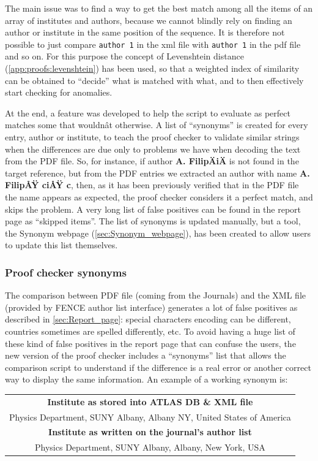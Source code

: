 The main issue was to find a way to get the best match among all the items of an array of institutes and authors,
because we cannot blindly rely on finding an author or institute in the same position of the sequence.
It is therefore not possible to just compare \texttt{author~1} in the xml file with \texttt{author~1} in the pdf file and so on.
For this purpose the concept of Levenshtein distance (\cref{app:proofs:levenshtein}) has been used,
so that a weighted index of similarity can be obtained to \enquote{decide} what is matched with what, and to then effectively start checking for anomalies.

At the end, a feature was developed to help the script to evaluate as perfect matches some that wouldnât otherwise.
A list of \enquote{synonyms} is created for every entry, author or institute,
to teach the proof checker to validate similar strings when the differences are due only to problems we have when decoding the text from the PDF file.
So, for instance, if author \textbf{A. FilipÄiÄ} is not found in the target reference,
but from the PDF entries we extracted an author with name \textbf{A. FilipÅŸ ciÅŸ c}, then,
as it has been previously verified that in the PDF file the name appears as expected, the proof checker considers it a perfect match, and skips the problem.
A very long list of false positives can be found in the report page as \enquote{skipped items}.
The list of synonyms is updated manually, but a tool, the Synonym webpage (\cref{sec:Synonym_webpage}), has been created to allow users to update this list themselves.


\subsubsection{Proof checker synonyms}%
\label{sec:Proof_checker_synonyms}

The comparison between PDF file (coming from the Journals) and the XML file (provided by FENCE author list interface) generates a lot of false positives as described in \cref{sec:Report_page}:
special characters encoding can be different, countries sometimes are spelled differently, etc.
To avoid having a huge list of these kind of false positives in the report page that can confuse the users, the new version of the proof checker includes a \enquote{synonyms} list that allows the comparison script to understand if the difference is a real error or another correct way to display the same information.
An example of a working synonym is:
\begin{table}[htb]
  \centering
  \begin{tabular}{c}
  \textbf{Institute as stored into ATLAS DB \& XML file} \\
  Physics Department, SUNY Albany, Albany NY, United States of America \\
  \midrule
  \textbf{Institute as written on the journal's author list} \\
  Physics Department, SUNY Albany, Albany, New York, USA
  \end{tabular}
\end{table}

